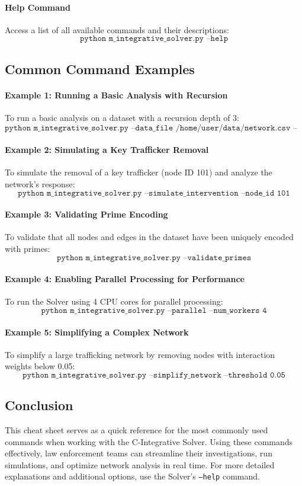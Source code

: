 \documentclass[%
 preprint, linenumbers,
 amsmath,amssymb,
 aps, physrev,
]{revtex4-2}
\begin{document}
\paragraph{Help Command}
Access a list of all available commands and their descriptions:
\[
\texttt{python m\_integrative\_solver.py --help}
\]

\subsection*{Common Command Examples}

\paragraph{Example 1: Running a Basic Analysis with Recursion}
To run a basic analysis on a dataset with a recursion depth of 3:
\[
\texttt{python m\_integrative\_solver.py --data\_file /home/user/data/network.csv --recursion\_depth 3}
\]

\paragraph{Example 2: Simulating a Key Trafficker Removal}
To simulate the removal of a key trafficker (node ID 101) and analyze the network’s response:
\[
\texttt{python m\_integrative\_solver.py --simulate\_intervention --node\_id 101}
\]

\paragraph{Example 3: Validating Prime Encoding}
To validate that all nodes and edges in the dataset have been uniquely encoded with primes:
\[
\texttt{python m\_integrative\_solver.py --validate\_primes}
\]

\paragraph{Example 4: Enabling Parallel Processing for Performance}
To run the Solver using 4 CPU cores for parallel processing:
\[
\texttt{python m\_integrative\_solver.py --parallel --num\_workers 4}
\]

\paragraph{Example 5: Simplifying a Complex Network}
To simplify a large trafficking network by removing nodes with interaction weights below 0.05:
\[
\texttt{python m\_integrative\_solver.py --simplify\_network --threshold 0.05}
\]

\subsection*{Conclusion}

This cheat sheet serves as a quick reference for the most commonly used commands when working with the C-Integrative Solver. Using these commands effectively, law enforcement teams can streamline their investigations, run simulations, and optimize network analysis in real time. For more detailed explanations and additional options, use the Solver’s \texttt{--help} command.
\end{document}
